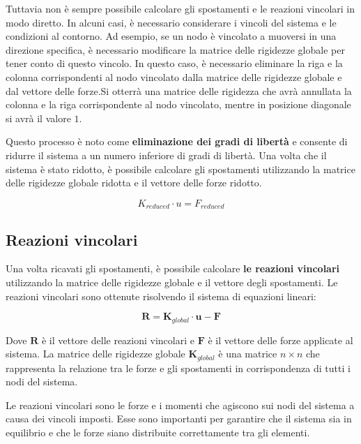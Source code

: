 \documentclass[10pt,a4paper]{article}
\begin{document}
Tuttavia non è sempre possibile calcolare gli spostamenti e le reazioni vincolari in modo diretto. In alcuni casi, è necessario considerare i vincoli del sistema e le condizioni al contorno. Ad esempio, se un nodo è vincolato a muoversi in una direzione specifica, è necessario modificare la matrice delle rigidezze globale per tener conto di questo vincolo. In questo caso, è necessario eliminare la riga e la colonna corrispondenti al nodo vincolato dalla matrice delle rigidezze globale e dal vettore delle forze.Si otterrà una matrice  delle rigidezza che avrà annullata la colonna e la riga corrispondente al nodo vincolato, mentre in posizione diagonale si avrà il valore $1$.

Questo processo è noto come \textbf{eliminazione dei gradi di libertà} e consente di ridurre il sistema a un numero inferiore di gradi di libertà. Una volta che il sistema è stato ridotto, è possibile calcolare gli spostamenti utilizzando la matrice delle rigidezze globale ridotta e il vettore delle forze ridotto.

\begin{equation}
    K_{reduced} \cdot u = F_{reduced}
\end{equation}


\subsection{Reazioni vincolari}
Una volta ricavati gli spostamenti, è possibile calcolare \textbf{le reazioni vincolari} utilizzando la matrice delle rigidezze globale e il vettore degli spostamenti. Le reazioni vincolari sono ottenute risolvendo il sistema di equazioni lineari:

\begin{equation}
    \mathbf{R} = \mathbf{K}_{global} \cdot \mathbf{u} - \mathbf{F}
\end{equation}

Dove $\mathbf{R}$ è il vettore delle reazioni vincolari e $\mathbf{F}$ è il vettore delle forze applicate al sistema. La matrice delle rigidezze globale $\mathbf{K}_{global}$ è una matrice $n \times n$ che rappresenta la relazione tra le forze e gli spostamenti in corrispondenza di tutti i nodi del sistema.

Le reazioni vincolari sono le forze e i momenti che agiscono sui nodi del sistema a causa dei vincoli imposti. Esse sono importanti per garantire che il sistema sia in equilibrio e che le forze siano distribuite correttamente tra gli elementi.
\end{document}

